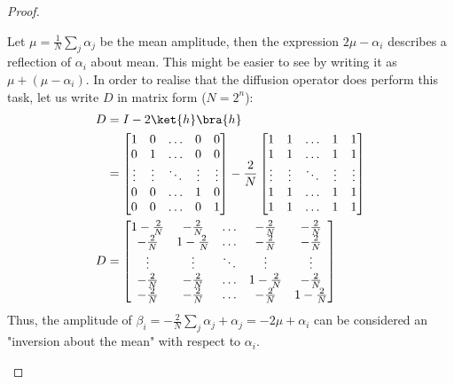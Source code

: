\documentclass[12pt, oneside]{book}
\theoremstyle{definition}
\theoremstyle{definition}
\theoremstyle{remark}
\begin{document}
\begin{proof}
\begin{enumerate}
\[        \]
        Let $\mu=\frac{1}{N}\sum_j\alpha_j$ be the mean amplitude, then the expression $2\mu-\alpha_i$ describes a reflection of $\alpha_i$ about mean. This might be easier to see by writing it as $\mu + (\mu -\alpha_i)$. In order to realise that the diffusion operator does perform this task, let us write $D$ in matrix form ($N=2^n$):
        \begin{align*}
        D&=I-2\ket{h}\bra{h}\\
        &=\begin{bmatrix} 1 & 0 & \ldots & 0 & 0 \\0 & 1 & \ldots & 0 & 0 \\ \vdots & \vdots &  \ddots & \vdots &\vdots \\0 & 0 & \ldots & 1 & 0 \\ 0 & 0 & \ldots & 0 & 1  \end{bmatrix} - \frac{2}{N}\begin{bmatrix} 1 & 1 & \ldots & 1 & 1 \\ 1 & 1 & \ldots & 1 & 1 \\\vdots & \vdots & \ddots & \vdots & \vdots \\ 1 & 1 & \ldots & 1 & 1 \\1 & 1 & \ldots & 1 & 1 \end{bmatrix} \\
        D&=\begin{bmatrix} 1 - \frac{2}{N}& -\frac{2}{N} & \ldots & -\frac{2}{N} & -\frac{2}{N} \\-\frac{2}{N} & 1-\frac{2}{N} & \ldots & -\frac{2}{N} & -\frac{2}{N} \\ \vdots & \vdots &  \ddots & \vdots &\vdots \\-\frac{2}{N} & -\frac{2}{N} & \ldots & 1-\frac{2}{N} & -\frac{2}{N} \\ -\frac{2}{N} & -\frac{2}{N} & \ldots & -\frac{2}{N} & 1-\frac{2}{N}  \end{bmatrix}
        \end{align*}
        Thus, the amplitude of $\beta_i=-\frac{2}{N}\sum_j\alpha_j+\alpha_j=-2\mu+\alpha_i$ can be considered an "inversion about the mean" with respect to $\alpha_i$.
    \end{enumerate}
\end{proof}
\end{document}
